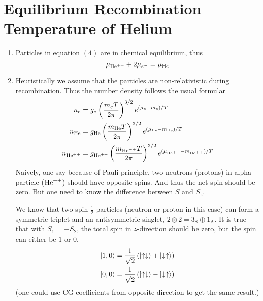 \section{Equilibrium Recombination Temperature of Helium}
\begin{enumerate}[label=(\alph*)]
   \item Particles in equation $(4)$ are in chemical equilibrium, thus
      \begin{equation}
         \mu_{\text{He}^{++}} + 2 \mu_{e^-} = \mu_{\text{He}}
      \end{equation}
   \item Heuristically we assume that the particles are non-relativistic during recombination. Thus the number density follows the usual formular
      \begin{align}
         n_e &= g_e \left( \frac{m_e T}{2\pi} \right)^{3/2} e^{(\mu_e - m_e)/T} \label{math:ne}\\
         n_{\text{He}} &= g_{\text{He}} \left( \frac{m_{\text{He}} T}{2\pi} \right)^{3/2} e^{(\mu_{\text{He}} - m_{\text{He}})/T} \label{math:nHe} \\
         n_{\text{He}^{++}} &= g_{\text{He}^{++}} \left( \frac{m_{\text{He}^{++}} T}{2\pi} \right)^{3/2} e^{(\mu_{\text{He}^{++}} - m_{\text{He}^{++}})/T} \label{math:nHepp}
      \end{align}
      Naively, one say because of Pauli principle, two neutrons (protons) in alpha particle (${\text{He}^{++}}$) should have opposite spins. And thus the net spin should be zero. But one need to know the difference between $S$ and $S_z$.

      We know that two spin $\frac{1}{2}$ particles (neutron or proton in this case) can form a symmetric triplet and an antisymmetric singlet, $ 2 \otimes 2 = 3_\text{S} \oplus 1_{\text{A}}$. It is true that with $S_1 = - S_2$, the total spin in $z$-direction should be zero, but the spin can either be $1$ or $0$.
      \begin{align*}
         \ket{ 1, 0} &= \frac{1}{\sqrt{2}} \left( \ket{\uparrow \downarrow} + \ket{\downarrow \uparrow } \right) \\
         \ket{ 0, 0} &= \frac{1}{\sqrt{2}} \left( \ket{\uparrow \downarrow} - \ket{\downarrow \uparrow } \right)
      \end{align*}
      (one could use CG-coefficients from opposite direction to get the same result.)


\end{enumerate}
